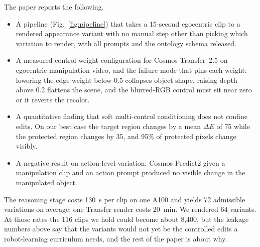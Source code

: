 The paper reports the following.
\begin{itemize}
    \item A pipeline (Fig.~\ref{fig:pipeline}) that takes a 15-second egocentric clip to a rendered appearance variant with no manual step other than picking which variation to render, with all prompts and the ontology schema released.
    \item A measured control-weight configuration for Cosmos Transfer~2.5 on egocentric manipulation video, and the failure mode that pins each weight: lowering the edge weight below 0.5 collapses object shape, raising depth above 0.2 flattens the scene, and the blurred-RGB control must sit near zero or it reverts the recolor.
    \item A quantitative finding that soft multi-control conditioning does not confine edits. On our best case the target region changes by a mean $\Delta E$ of 75 while the protected region changes by 35, and 95\% of protected pixels change visibly.
    \item A negative result on action-level variation: Cosmos Predict2 given a manipulation clip and an action prompt produced no visible change in the manipulated object.
\end{itemize}

The reasoning stage costs 130~s per clip on one A100 and yields 72 admissible variations on average; one Transfer render costs 20~min. We rendered 64 variants. At those rates the 116 clips we hold could become about 8{,}400, but the leakage numbers above say that the variants would not yet be the controlled edits a robot-learning curriculum needs, and the rest of the paper is about why.
